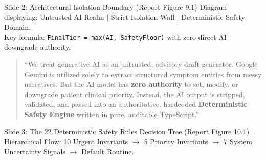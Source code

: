 \documentclass[11pt,a4paper]{article}
\begin{document}
\begin{slidebox}{Slide 2: Architectural Isolation Boundary (Report Figure 9.1)}
Diagram displaying: Untrusted AI Realm $\vert$ Strict Isolation Wall $\vert$ Deterministic Safety Domain.\\
Key formula: \texttt{FinalTier = max(AI, SafetyFloor)} with zero direct AI downgrade authority.
\end{slidebox}

\begin{quote}
``We treat generative AI as an untrusted, advisory draft generator. Google Gemini is utilized solely to extract structured symptom entities from messy narratives. But the AI model has \textbf{zero authority} to set, modify, or downgrade patient clinical priority. Instead, the AI output is stripped, validated, and passed into an authoritative, hardcoded \textbf{Deterministic Safety Engine} written in pure, auditable TypeScript.''
\end{quote}

\begin{slidebox}{Slide 3: The 22 Deterministic Safety Rules Decision Tree (Report Figure 10.1)}
Hierarchical Flow: 10 Urgent Invariants $\to$ 5 Priority Invariants $\to$ 7 System Uncertainty Signals $\to$ Default Routine.
\end{slidebox}
\end{document}
